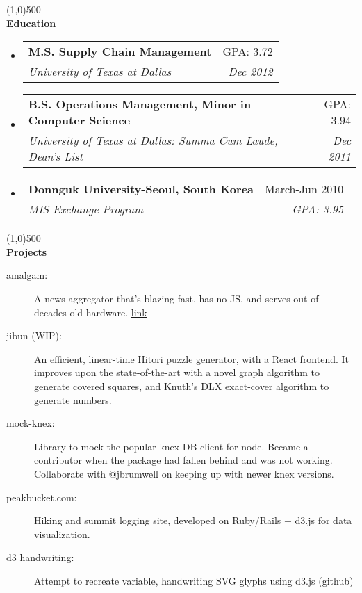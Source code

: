 \documentclass[letterpaper,11pt]{article}
\makeatletter
\newcommand{\resheading}[1]{{\large {\textbf{#1 \vphantom{p\^{E}}}}}}
\newcommand{\addline}{\line(1,0){500}}
\newcommand{\ressubheading}[4]{
	\begin{tabular*}{6.5in}{l@{\extracolsep{\fill}}r}
			\textbf{#1} & #2 \\
			\textit{#3} & \textit{#4} \\
	\end{tabular*}\vspace{-6pt}}
\makeatother
\begin{document}
\addline
\\
\resheading{Education}
\begin{itemize}
\item
	\ressubheading{M.S. Supply Chain Management}{GPA: 3.72}
{University of Texas at Dallas}{Dec 2012}

\item
	\ressubheading{B.S. Operations Management, Minor in Computer Science}
		{GPA: 3.94}{University of Texas at Dallas: Summa Cum Laude, Dean's
			List}{Dec 2011}

\item
	\ressubheading{Donnguk University-Seoul, South Korea}{March-Jun 2010}{MIS
		Exchange Program}{GPA: 3.95}
\end{itemize}

\pagebreak
\addline
\\
\resheading{Projects}
\begin{description}
	\item [amalgam:] A news aggregator that's blazing-fast, has no JS, and serves out of decades-old hardware. \href{http://links.maxalcala.com}{link}
	
	\item [jibun (WIP):] An efficient, linear-time \href{https://en.wikipedia.org/wiki/Hitori}{Hitori} puzzle generator, with a React frontend. It improves upon the state-of-the-art with a novel graph algorithm to generate covered squares, and Knuth's DLX exact-cover algorithm to generate numbers.

  \item [mock-knex:] Library to mock the popular knex DB client for node. Became a contributor when the
    package had fallen behind and was not working. Collaborate with @jbrumwell on keeping up with newer knex versions.

  \item [peakbucket.com:] Hiking and summit logging site, developed on Ruby/Rails + d3.js for data visualization.

  \item [d3 handwriting:] Attempt to recreate variable, handwriting SVG glyphs using d3.js (github)
\end{description}
\end{document}
